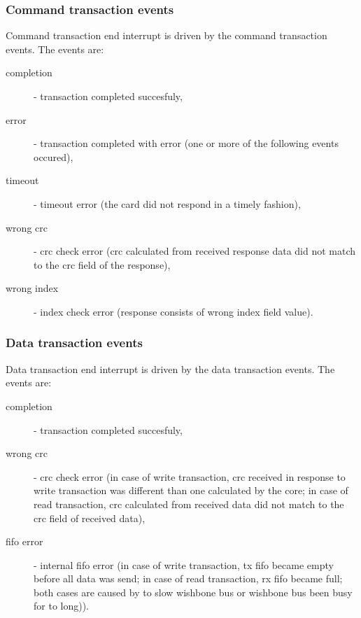     \subsubsection{Command transaction events}
    \label{sec:cmd_events}

    Command transaction end interrupt is driven by the command transaction events. The events are:
    \begin{description}
    \item[completion] - transaction completed succesfuly,
    \item[error] - transaction completed with error (one or more of the following events occured),
    \item[timeout] - timeout error (the card did not respond in a timely fashion),
    \item[wrong crc] - crc check error (crc calculated from received response data did not match to the crc field of the response),
    \item[wrong index] - index check error (response consists of wrong index field value).
    \end{description}
    
    \subsubsection{Data transaction events}
    \label{sec:data_events}

    Data transaction end interrupt is driven by the data transaction events. The events are:
    \begin{description}
    \item[completion] - transaction completed succesfuly,
    \item[wrong crc] - crc check error (in case of write transaction, crc received in response to write transaction was different than one calculated by the core; 
    in case of read transaction, crc calculated from received data did not match to the crc field of received data),
    \item[fifo error] - internal fifo error (in case of write transaction, tx fifo became empty before all data was send; in case of read transaction, rx fifo became
    full; both cases are caused by to slow wishbone bus or wishbone bus been busy for to long)).
    \end{description}
    

    